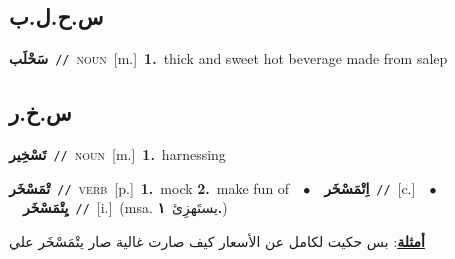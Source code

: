 \documentclass[10pt,a4paper,twoside]{article} %
\begin{document}
\begin{multicols}{2}
\vspace{-3mm}
\subsection*{\color{blue}\foreignlanguage{arabic}{س.ح.ل.ب}\color{blue}{ (ntws)}} 

{\setlength\topsep{0pt}\textbf{\foreignlanguage{arabic}{سَحْلَب}}\ {\color{gray}\texttt{//}\color{black}}\ \textsc{noun}\ [m.]\ \textbf{1.}~thick and sweet hot beverage made from salep\ } \vspace{2mm}

\vspace{-3mm}
\subsection*{\color{blue}\foreignlanguage{arabic}{س.خ.ر}\color{blue}{}} 

{\setlength\topsep{0pt}\textbf{\foreignlanguage{arabic}{تَسْخِير}}\ {\color{gray}\texttt{//}\color{black}}\ \textsc{noun}\ [m.]\ \textbf{1.}~harnessing\ } \vspace{2mm}

{\setlength\topsep{0pt}\textbf{\foreignlanguage{arabic}{تْمَسْخَر}}\ {\color{gray}\texttt{//}\color{black}}\ \textsc{verb}\ [p.]\ \textbf{1.}~mock  \textbf{2.}~make fun of\ \ $\bullet$\ \ \setlength\topsep{0pt}\textbf{\foreignlanguage{arabic}{اِتْمَسْخَر}}\ {\color{gray}\texttt{//}\color{black}}\ [c.]\ \ $\bullet$\ \ \setlength\topsep{0pt}\textbf{\foreignlanguage{arabic}{يِتْمَسْخَر}}\ {\color{gray}\texttt{//}\color{black}}\ [i.]\ \color{gray}(msa. \foreignlanguage{arabic}{يستَهزِئ}~\foreignlanguage{arabic}{\textbf{١.}})\color{black}\  \begin{flushright}\color{gray}\foreignlanguage{arabic}{\textbf{\underline{\foreignlanguage{arabic}{أمثلة}}}: بس حكيت لكامل عن الأسعار كيف صارت غالية صار يتْمَسْخَر علي}\end{flushright}\color{black}} \vspace{2mm}


\end{multicols}
\end{document}

